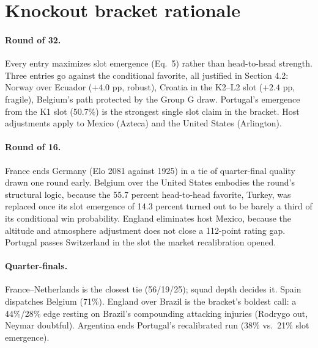 \documentclass[11pt,letterpaper]{article}
\begin{document}


\section{Knockout bracket rationale}\label{app:bracket}

\paragraph{Round of 32.} Every entry maximizes slot emergence (Eq.~5) rather than head-to-head strength. Three entries go against the conditional favorite, all justified in Section 4.2: Norway over Ecuador ($+4.0$ pp, robust), Croatia in the K2--L2 slot ($+2.4$ pp, fragile), Belgium's path protected by the Group G draw. Portugal's emergence from the K1 slot (50.7\%) is the strongest single slot claim in the bracket. Host adjustments apply to Mexico (Azteca) and the United States (Arlington).

\paragraph{Round of 16.} France ends Germany (Elo 2081 against 1925) in a tie of quarter-final quality drawn one round early. Belgium over the United States embodies the round's structural logic, because the 55.7 percent head-to-head favorite, Turkey, was replaced once its slot emergence of 14.3 percent turned out to be barely a third of its conditional win probability. England eliminates host Mexico, because the altitude and atmosphere adjustment does not close a 112-point rating gap. Portugal passes Switzerland in the slot the market recalibration opened.

\paragraph{Quarter-finals.} France--Netherlands is the closest tie (56/19/25); squad depth decides it. Spain dispatches Belgium (71\%). England over Brazil is the bracket's boldest call: a 44\%/28\% edge resting on Brazil's compounding attacking injuries (Rodrygo out, Neymar doubtful). Argentina ends Portugal's recalibrated run (38\% vs.\ 21\% slot emergence).
\end{document}
